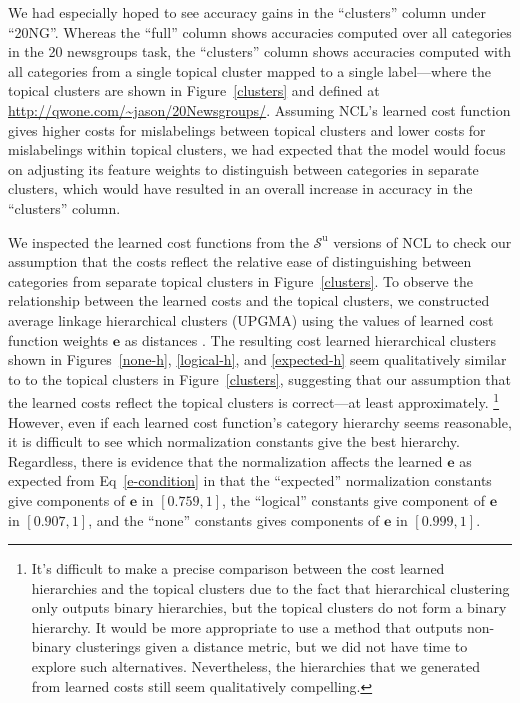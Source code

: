 \documentclass{article} %
\newcommand{\unorderedS}{\mathcal{S}^{\mathrm{u}}}
\newcommand{\ourmethod}{NCL}
\begin{document}
We had especially hoped to see accuracy
gains in the ``clusters'' column under ``20NG''.  Whereas the 
``full'' column shows accuracies computed over all categories
 in the 20 newsgroups task, the ``clusters'' column
shows accuracies computed with all categories from a single
topical cluster mapped to a single label---where the topical
clusters are shown in Figure~\ref{clusters} and
defined at \url{http://qwone.com/~jason/20Newsgroups/}.  
Assuming
\ourmethod{}'s learned cost function gives 
higher costs for 
mislabelings between topical clusters and lower 
costs for mislabelings
within topical clusters, we had 
expected that the model would focus
on adjusting its feature weights 
to distinguish between categories
in separate clusters, which would have 
resulted in an overall increase in
 accuracy in the ``clusters'' column.  
 
We inspected the learned cost functions from 
the $\unorderedS$ versions of \ourmethod{} 
to check our assumption that the costs reflect the 
relative ease of
distinguishing between categories from separate topical 
clusters in
Figure~\ref{clusters}.  To observe the relationship between 
the learned costs and the
topical clusters, we constructed average linkage hierarchical 
clusters (UPGMA)
using the values of learned cost function weights $\mathbf{e}$ 
as distances \citep{legendrenumerical}.  
The resulting cost learned hierarchical clusters shown 
in Figures~\ref{none-h}, \ref{logical-h}, 
and \ref{expected-h} seem qualitatively similar to
to the topical clusters in Figure~\ref{clusters}, suggesting
that our assumption that the learned costs reflect
the topical clusters is correct---at least approximately.
\footnote{It's difficult to make a precise comparison between
the cost learned hierarchies and the topical clusters due
to the fact that hierarchical clustering only outputs 
binary hierarchies, but the topical clusters do not form a
 binary hierarchy.  It would be more appropriate to use
 a method that outputs non-binary clusterings given a 
 distance metric, but we did not have time to explore such
 alternatives.
 Nevertheless, the hierarchies that
 we generated from learned costs still seem qualitatively
 compelling.}  However, even if each learned cost function's
 category hierarchy seems reasonable, it is difficult to 
 see which normalization constants give the best
 hierarchy.  Regardless, there is evidence that the normalization 
 affects the learned $\mathbf{e}$ as expected from 
 Eq~\ref{e-condition} in that the ``expected'' normalization
 constants give components of $\mathbf{e}$ in $[0.759,1]$, the
 ``logical'' constants give component of $\mathbf{e}$ in
 $[0.907, 1]$, and the ``none'' constants gives components of
 $\mathbf{e}$ in $[0.999,1]$.
\end{document}
